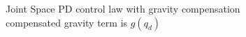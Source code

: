 \documentclass{article}
\begin{document}
\begin{figure}[H]
    \captionsetup{justification=centering}
    \noindent

    \caption{Joint Space PD control law with gravity compensation \\ compensated gravity term is $g(q_d)$}
    \label{fig:js_PD_gravity_compensation_joint_wrong_g}
\end{figure}
\end{document}
